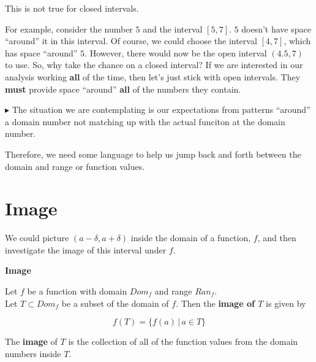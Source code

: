 \documentclass{ximera}
\begin{document}
This is not true for closed intervals.


For example, consider the number $5$ and the interval $[5, 7]$.  $5$ doesn't have space ``around'' it in this interval. Of course, we could choose the interval $[4,7]$, which has space ``around'' $5$.  However, there would now be the open interval $(4.5, 7)$ to use.  So, why take the chance on a closed interval?  If we are interested in our analysis working \textbf{\textcolor{red!80!black}{all}} of the time, then let's just stick with open intervals.  They \textbf{must} provide space ``around'' \textbf{\textcolor{red!80!black}{all}} of the numbers they contain.





\textbf{\textcolor{red!90!darkgray}{$\blacktriangleright$}} The situation we are contemplating is our expectations from patterns ``around'' a domain number not matching up with the actual funciton at the domain number.

Therefore, we need some language to help us jump back and forth between the domain and range or function values.





















\section{Image}


We could picture $(a-\delta, a+\delta)$ inside the domain of a function, $f$, and then investigate the image of this interval under $f$.  







\begin{definition} \textbf{\textcolor{green!50!black}{Image}}

Let $f$ be a function with domain $Dom_f$ and range $Ran_f$. \\
Let $T \subset Dom_f$ be a subset of the domain of $f$.  Then the \textbf{image of $T$} is given by

\[       f(T) = \{   f(a)  \, | \, a \in T            \}             \]


The \textbf{image} of $T$ is the collection of all of the function values from the domain numbers inside $T$.


\end{definition}
\end{document}
